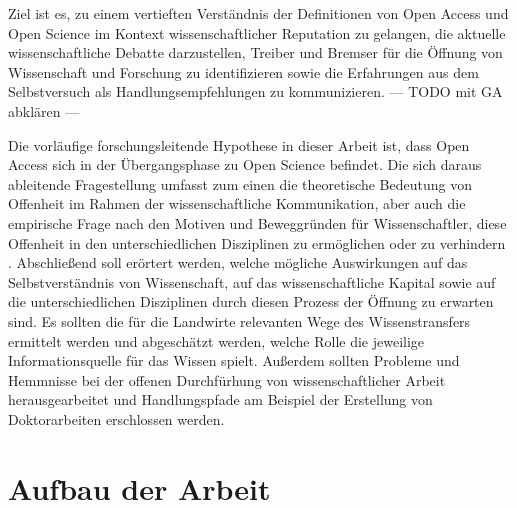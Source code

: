 Ziel ist es, zu einem vertieften Verständnis der Definitionen von Open Access und Open Science im Kontext wissenschaftlicher Reputation zu gelangen, die aktuelle wissenschaftliche Debatte darzustellen, Treiber und Bremser für die Öffnung von Wissenschaft und Forschung zu identifizieren sowie die Erfahrungen aus dem Selbstversuch als Handlungsempfehlungen zu kommunizieren. --- TODO mit GA abklären --- 

Die vorläufige forschungsleitende Hypothese in dieser Arbeit ist, dass Open Access sich in der Übergangsphase zu Open Science befindet. Die sich daraus ableitende Fragestellung umfasst zum einen die theoretische Bedeutung von Offenheit im Rahmen der wissenschaftliche Kommunikation, aber auch die empirische Frage nach den Motiven und Beweggründen für Wissenschaftler, diese Offenheit in den unterschiedlichen Disziplinen zu ermöglichen oder zu verhindern . Abschließend soll erörtert werden, welche mögliche Auswirkungen auf das Selbstverständnis von Wissenschaft, auf das wissenschaftliche Kapital sowie auf die unterschiedlichen Disziplinen durch diesen Prozess der Öffnung zu erwarten sind. Es sollten die für die Landwirte relevanten Wege des Wissenstransfers ermittelt werden und abgeschätzt werden, welche Rolle die jeweilige Informationsquelle für das Wissen spielt. Außerdem sollten Probleme und Hemmnisse bei der offenen Durchfürhung von wissenschaftlicher Arbeit herausgearbeitet und Handlungspfade am Beispiel der Erstellung von Doktorarbeiten erschlossen werden.

\section{Aufbau der Arbeit} 

